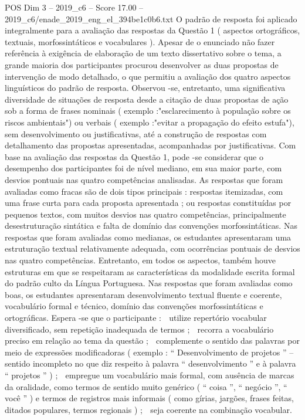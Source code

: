 \begin{textsample}{POS Dim 3 – 2019\_c6 – Score 17.00 – 2019\_c6/enade\_2019\_eng\_el\_394be1c0b6.txt}
O padrão de resposta foi aplicado integralmente para a avaliação das respostas da Questão 1 ( aspectos ortográficos, textuais, morfossintáticos e vocabulares ).
Apesar de o enunciado não fazer referência à exigência de elaboração de um texto dissertativo sobre o tema, a grande maioria dos participantes procurou desenvolver as duas propostas de intervenção de modo detalhado, o que permitiu a avaliação dos quatro aspectos linguísticos do padrão de resposta.
Observou -se, entretanto, uma significativa diversidade de situações de resposta desde a citação de duas propostas de ação sob a forma de frases nominais ( exemplo :"esclarecimento à população sobre os riscos ambientais") ou verbais ( exemplo :"evitar a propagação do efeito estufa"), sem desenvolvimento ou justificativas, até a construção de respostas com detalhamento das propostas apresentadas, acompanhadas por justificativas.
Com base na avaliação das respostas da Questão 1, pode -se considerar que o desempenho dos participantes foi de nível mediano, em sua maior parte, com desvios pontuais nas quatro competências analisadas.
As respostas que foram avaliadas como fracas são de dois tipos principais : respostas itemizadas, com uma frase curta para cada proposta apresentada ; ou respostas constituídas por pequenos textos, com muitos desvios nas quatro competências, principalmente desestruturação sintática e falta de domínio das convenções morfossintáticas.
Nas respostas que foram avaliadas como medianas, os estudantes apresentaram uma estruturação textual relativamente adequada, com ocorrências pontuais de desvios nas quatro competências.
Entretanto, em todos os aspectos, também houve estruturas em que se respeitaram as características da modalidade escrita formal do padrão culto da Língua Portuguesa.
Nas respostas que foram avaliadas como boas, os estudantes apresentaram desenvolvimento textual fluente e coerente, vocabulário formal e técnico, domínio das convenções morfossintáticas e ortográficas.
Espera -se que o participante :  utilize repertório vocabular diversificado, sem repetição inadequada de termos ;  recorra a vocabulário preciso em relação ao tema da questão ;  complemente o sentido das palavras por meio de expressões modificadoras ( exemplo : “ Desenvolvimento de projetos ” – sentido incompleto no que diz respeito à palavra “ desenvolvimento ” e à palavra “ projetos ” ) ;  empregue um vocabulário mais formal, com ausência de marcas da oralidade, como termos de sentido muito genérico ( “ coisa ”, “ negócio ”, “ você ” ) e termos de registros mais informais ( como gírias, jargões, frases feitas, ditados populares, termos regionais ) ;  seja coerente na combinação vocabular.

\end{textsample}
